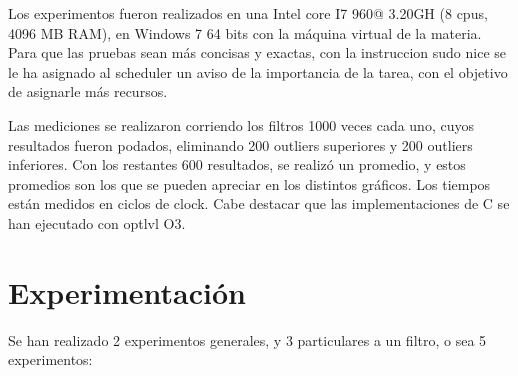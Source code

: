 \documentclass[a4paper]{article}
\begin{document}
Los experimentos fueron realizados en una Intel core I7 960@ 3.20GH (8 cpus, 4096 MB RAM), en Windows 7 64 bits con la máquina virtual de la materia. Para que las pruebas sean más concisas y exactas, con la instruccion sudo nice se le ha asignado al scheduler un aviso de la importancia de la tarea, con el objetivo de asignarle más recursos.

Las mediciones se realizaron corriendo los filtros 1000 veces cada uno, cuyos resultados fueron podados, eliminando 200 outliers superiores y 200 outliers inferiores. Con los restantes 600 resultados, se realizó un promedio, y estos promedios son los que se pueden apreciar en los distintos gráficos. Los tiempos están medidos en ciclos de clock. Cabe destacar que las implementaciones de C se han ejecutado con optlvl O3.


\newpage

\section{Experimentación}
 Se han realizado 2 experimentos generales, y 3 particulares a un filtro, o sea 5 experimentos:
 
\end{document}
